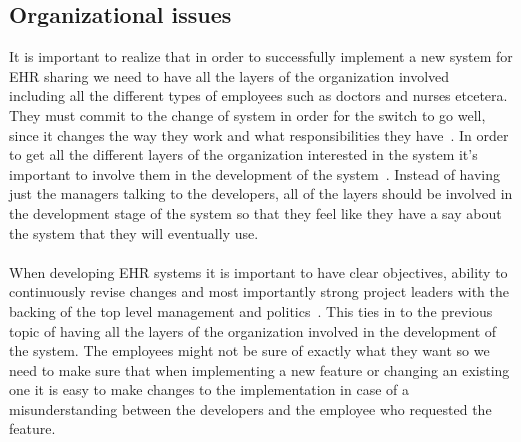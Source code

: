 \documentclass[14pt]{article}
\begin{document}
\subsection{Organizational issues}
It is important to realize that in order to successfully implement a new system for \gls{EHR} sharing we need to have all the layers of the organization involved~\cite{Empirica} including all the different types of employees such as doctors and nurses etcetera. They must commit to the change of system in order for the switch to go well, since it changes the way they work and what responsibilities they have~\cite{Empirica}. In order to get all the different layers of the organization interested in the system it's important to involve them in the development of the system~\cite{Empirica}. Instead of having just the managers talking to the developers, all of the layers should be involved in the development stage of the system so that they feel like they have a say about the system that they will eventually use.
\\\\
When developing \gls{EHR} systems it is important to have clear objectives, ability to continuously revise changes and most importantly strong project leaders with the backing of the top level management and politics~\cite{Empirica}. This ties in to the previous topic of having all the layers of the organization involved in the development of the system. The employees might not be sure of exactly what they want so we need to make sure that when implementing a new feature or changing an existing one it is easy to make changes to the implementation in case of a misunderstanding between the developers and the employee who requested the feature.
\\\\

\end{document}
